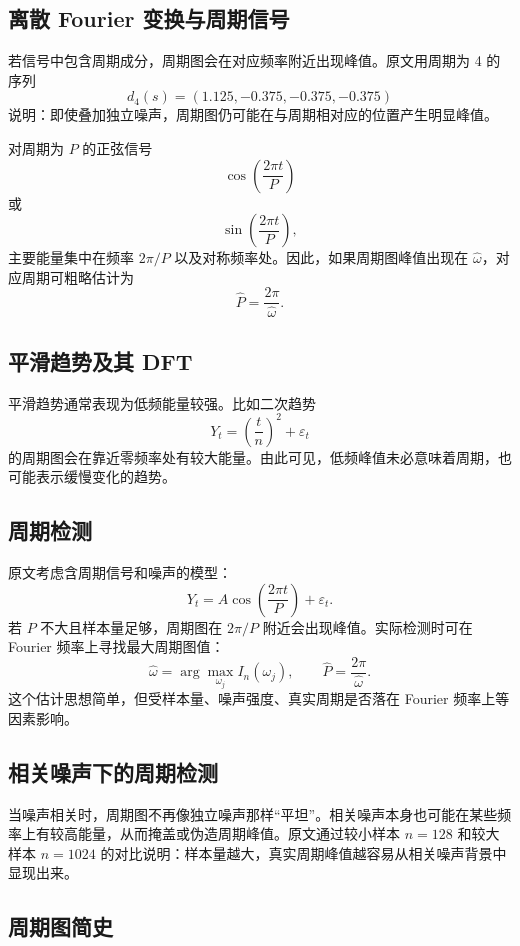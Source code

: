 \documentclass[11pt,a4paper]{ctexart}
\begin{document}
\subsection{离散 Fourier 变换与周期信号}

若信号中包含周期成分，周期图会在对应频率附近出现峰值。原文用周期为 4 的序列
\[
  d_4(s)=(1.125,-0.375,-0.375,-0.375)
\]
说明：即使叠加独立噪声，周期图仍可能在与周期相对应的位置产生明显峰值。

对周期为 \(P\) 的正弦信号
\[
  \cos\left(\frac{2\pi t}{P}\right)
\]
或
\[
  \sin\left(\frac{2\pi t}{P}\right),
\]
主要能量集中在频率 \(2\pi/P\) 以及对称频率处。因此，如果周期图峰值出现在 \(\hat{\omega}\)，对应周期可粗略估计为
\[
  \hat{P}=\frac{2\pi}{\hat{\omega}}.
\]

\subsection{平滑趋势及其 DFT}

平滑趋势通常表现为低频能量较强。比如二次趋势
\[
  Y_t=\left(\frac{t}{n}\right)^2+\varepsilon_t
\]
的周期图会在靠近零频率处有较大能量。由此可见，低频峰值未必意味着周期，也可能表示缓慢变化的趋势。

\subsection{周期检测}

原文考虑含周期信号和噪声的模型：
\[
  Y_t=A\cos\left(\frac{2\pi t}{P}\right)+\varepsilon_t.
\]
若 \(P\) 不大且样本量足够，周期图在 \(2\pi/P\) 附近会出现峰值。实际检测时可在 Fourier 频率上寻找最大周期图值：
\[
  \hat{\omega}
  =\arg\max_{\omega_j} I_n(\omega_j),
  \qquad
  \hat{P}=\frac{2\pi}{\hat{\omega}}.
\]
这个估计思想简单，但受样本量、噪声强度、真实周期是否落在 Fourier 频率上等因素影响。

\subsection{相关噪声下的周期检测}

当噪声相关时，周期图不再像独立噪声那样“平坦”。相关噪声本身也可能在某些频率上有较高能量，从而掩盖或伪造周期峰值。原文通过较小样本 \(n=128\) 和较大样本 \(n=1024\) 的对比说明：样本量越大，真实周期峰值越容易从相关噪声背景中显现出来。

\subsection{周期图简史}
\end{document}
